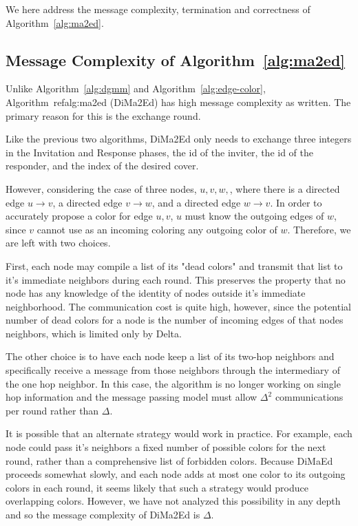 \label{sec:dima2ed-correct}
We here address the message complexity, termination and correctness of Algorithm~\ref{alg:ma2ed}.

\subsection{Message Complexity of Algorithm~\ref{alg:ma2ed}}

Unlike Algorithm~\ref{alg:dgmm} and Algorithm~\ref{alg:edge-color}, Algorithm~ref{alg:ma2ed} (DiMa2Ed) has high message complexity as written. The primary reason for this is the exchange round.

Like the previous two algorithms, DiMa2Ed only needs to exchange three integers in the Invitation and Response phases, the id of the inviter, the id of the responder, and the index of the desired cover.

However, considering the case of three nodes, $u,v,w,$, where there is a directed edge $u \to v$, a directed edge $v \to w$, and a directed edge $w \to v$. In order to accurately propose a color for edge $u,v$, $u$ must know the outgoing edges of $w$, since $v$ cannot use as an incoming coloring any outgoing color of $w$. Therefore, we are left with two choices.

First, each node may compile a list of its "dead colors" and transmit that list to it's immediate neighbors during each round. This preserves the property that no node has any knowledge of the identity of nodes outside it's immediate neighborhood. The communication cost is quite high, however, since the potential number of dead colors for a node is the number of incoming edges of that nodes neighbors, which is limited only by Delta. 

The other choice is to have each node keep a list of its two-hop neighbors and specifically receive a message from those neighbors through the intermediary of the one hop neighbor. In this case, the algorithm is no longer working on single hop information and the message passing model must allow $\Delta^2$ communications per round rather than $\Delta$.

It is possible that an alternate strategy would work in practice. For example, each node could pass it's neighbors a fixed number of possible colors for the next round, rather than a comprehensive list of forbidden colors. Because DiMaEd proceeds somewhat slowly, and each node adds at most one color to its outgoing colors in each round, it seems likely that such a strategy would produce overlapping colors. However, we have not analyzed this possibility in any depth and so the message complexity of DiMa2Ed is $\Delta$.

